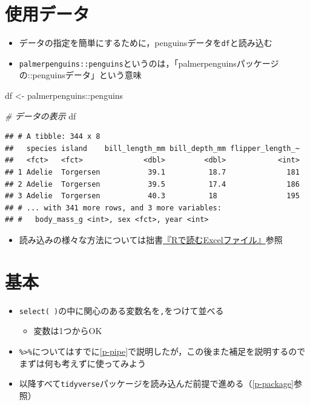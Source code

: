 \documentclass[
  xelatex,ja=standard, b5paper]{bxjsbook}
\newenvironment{Shaded}{\begin{snugshade}}{\end{snugshade}}
\newcommand{\CommentTok}[1]{\textcolor[rgb]{0.56,0.35,0.01}{\textit{#1}}}
\newcommand{\NormalTok}[1]{#1}
\newcommand{\OtherTok}[1]{\textcolor[rgb]{0.56,0.35,0.01}{#1}}
\newcommand{\SpecialCharTok}[1]{\textcolor[rgb]{0.00,0.00,0.00}{#1}}
\providecommand{\tightlist}{%
  \setlength{\itemsep}{0pt}\setlength{\parskip}{0pt}}
\begin{document}
\hypertarget{select-read}{%
\section{使用データ}\label{select-read}}

\begin{itemize}
\tightlist
\item
  データの指定を簡単にするために，penguinsデータを\texttt{df}と読み込む
\item
  \texttt{palmerpenguins::penguins}というのは，「palmerpenguinsパッケージの::penguinsデータ」という意味
\end{itemize}

\begin{Shaded}
\begin{Highlighting}[]
\NormalTok{df }\OtherTok{\textless{}{-}} 
\NormalTok{  palmerpenguins}\SpecialCharTok{::}\NormalTok{penguins}

\CommentTok{\# データの表示  }
\NormalTok{df }
\end{Highlighting}
\end{Shaded}

\begin{verbatim}
## # A tibble: 344 x 8
##   species island    bill_length_mm bill_depth_mm flipper_length_~
##   <fct>   <fct>              <dbl>         <dbl>            <int>
## 1 Adelie  Torgersen           39.1          18.7              181
## 2 Adelie  Torgersen           39.5          17.4              186
## 3 Adelie  Torgersen           40.3          18                195
## # ... with 341 more rows, and 3 more variables:
## #   body_mass_g <int>, sex <fct>, year <int>
\end{verbatim}

\begin{itemize}
\tightlist
\item
  読み込みの様々な方法については拙書\href{https://techbookfest.org/product/4794168259903488?productVariantID=5913872206659584}{『Rで読むExcelファイル』}参照
\end{itemize}

\hypertarget{select-standard}{%
\section{基本}\label{select-standard}}

\begin{itemize}
\tightlist
\item
  \texttt{select(\ )}の中に関心のある変数名を\texttt{,}をつけて並べる

  \begin{itemize}
  \tightlist
  \item
    変数は1つからOK
  \end{itemize}
\item
  \texttt{\%\textgreater{}\%}についてはすでに\ref{p-pipe}で説明したが，この後また補足を説明するのでまずは何も考えずに使ってみよう
\item
  以降すべて\texttt{tidyverse}パッケージを読み込んだ前提で進める（\ref{p-package}参照）
\end{itemize}
\end{document}
